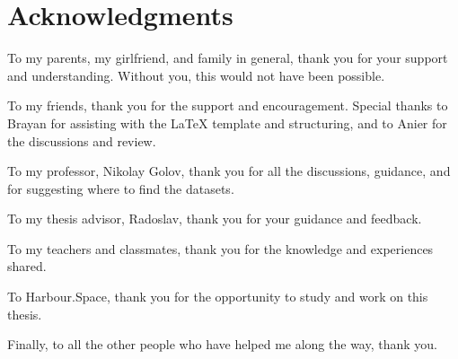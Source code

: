 \section*{\Huge \textbf{Acknowledgments}}

\vspace{0.5cm}

To my parents, my girlfriend, and family in general, thank you for your support and 
understanding. Without you, this would not have been possible.

To my friends, thank you for the support and encouragement. Special thanks to Brayan for 
assisting with the LaTeX template and structuring, and to Anier for the discussions and review.

To my professor, Nikolay Golov, thank you for all the discussions, guidance, and for 
suggesting where to find the datasets.

To my thesis advisor, Radoslav, thank you for your guidance and feedback.

To my teachers and classmates, thank you for the knowledge and experiences shared.

To Harbour.Space, thank you for the opportunity to study and work on this thesis.

Finally, to all the other people who have helped me along the way, thank you.